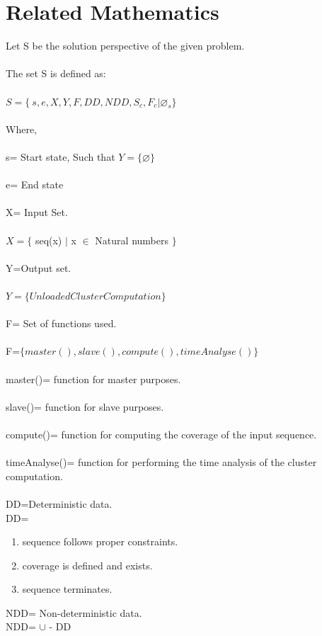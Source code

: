\documentclass[10pt,a4paper]{article}
\begin{document}
\section{Related Mathematics}
Let S be the solution perspective of the given problem.
\\\\The set S is defined as:
\\\\$S=\lbrace\ s,e,X,Y,F,DD,NDD,S_{c},F_{c}|\varnothing_{s}\rbrace$
\\\\Where,
\\\\s= Start state,  Such that $Y=\lbrace \varnothing \rbrace$ 
\\\\e= End state 
\\\\X= Input Set.
\\\\$X=\lbrace$ seq(x) $\mid$ x $\in$ Natural numbers $\rbrace$
\\\\Y=Output set.
\\\\$Y=\lbrace UnloadedClusterComputation \rbrace $
\\\\F= Set of functions used.
\\\\F=$\lbrace master(), slave(), compute(), timeAnalyse()\rbrace$
\\\\master()= function for master purposes.
\\\\slave()= function for slave purposes.
\\\\compute()= function for computing the coverage of the input sequence.
\\\\timeAnalyse()= function for performing the time analysis of the cluster computation.
\\\\DD=Deterministic data.
\\DD=
\begin{enumerate}
\item sequence follows proper constraints.
\item coverage is defined and exists.
\item sequence terminates.
\end{enumerate}
NDD= Non-deterministic data.
\\NDD= $\cup$ - DD
\end{document}
